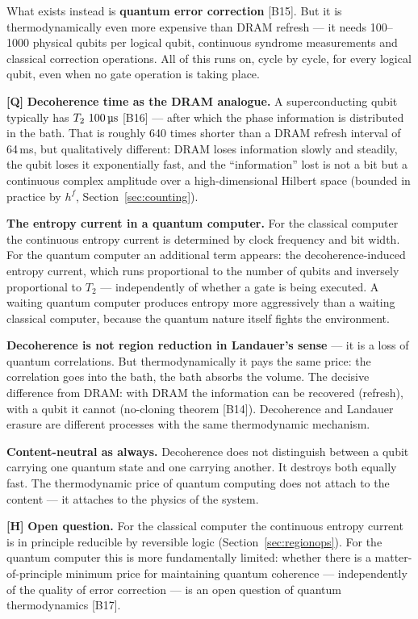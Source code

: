 What exists instead is \textbf{quantum error correction} [B15]. But it is
thermodynamically even more expensive than DRAM refresh --- it needs 100--1000
physical qubits per logical qubit, continuous syndrome measurements and classical
correction operations. All of this runs on, cycle by cycle, for every logical
qubit, even when no gate operation is taking place.

\textbf{[Q]} \textbf{Decoherence time as the DRAM analogue.} A superconducting qubit
typically has $T_2 \sim 100\,\text{\textmu s}$ [B16] --- after which the phase
information is distributed in the bath. That is roughly 640 times shorter than a
DRAM refresh interval of 64\,ms, but qualitatively different: DRAM loses
information slowly and steadily, the qubit loses it exponentially fast, and the
“information” lost is not a bit but a continuous complex amplitude over a
high-dimensional Hilbert space (bounded in practice by $h^f$,
Section~\ref{sec:counting}).

\textbf{The entropy current in a quantum computer.} For the classical computer the
continuous entropy current is determined by clock frequency and bit width. For the
quantum computer an additional term appears: the decoherence-induced entropy
current, which runs proportional to the number of qubits and inversely
proportional to $T_2$ --- independently of whether a gate is being executed. A
waiting quantum computer produces entropy more aggressively than a waiting
classical computer, because the quantum nature itself fights the environment.

\textbf{Decoherence is not region reduction in Landauer's sense} --- it is a loss
of quantum correlations. But thermodynamically it pays the same price: the
correlation goes into the bath, the bath absorbs the volume. The decisive
difference from DRAM: with DRAM the information can be recovered (refresh), with a
qubit it cannot (no-cloning theorem [B14]). Decoherence and Landauer erasure are
different processes with the same thermodynamic mechanism.

\textbf{Content-neutral as always.} Decoherence does not distinguish between a
qubit carrying one quantum state and one carrying another. It destroys both
equally fast. The thermodynamic price of quantum computing does not attach to the
content --- it attaches to the physics of the system.

\textbf{[H]} \textbf{Open question.} For the classical computer the continuous entropy
current is in principle reducible by reversible logic
(Section~\ref{sec:regionops}). For the quantum computer this is more
fundamentally limited: whether there is a matter-of-principle minimum price for
maintaining quantum coherence --- independently of the quality of error correction
--- is an open question of quantum thermodynamics [B17].


